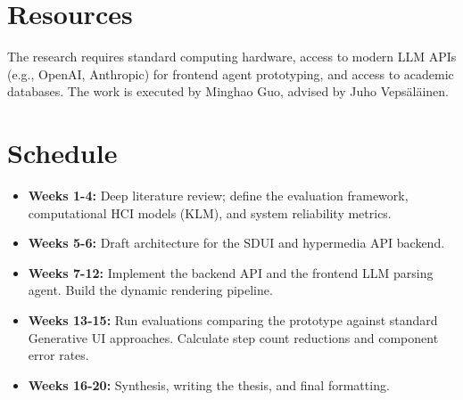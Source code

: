\documentclass[12pt,a4paper,english,oneside]{article}
\begin{document}
\section{Resources}


The research requires standard computing hardware, access to modern LLM APIs (e.g., OpenAI, Anthropic) for frontend agent prototyping, and access to academic databases. The work is executed by Minghao Guo, advised by Juho Vepsäläinen.

\section{Schedule}



\begin{itemize}
    \item \textbf{Weeks 1-4:} Deep literature review; define the evaluation framework, computational HCI models (KLM), and system reliability metrics.
    \item \textbf{Weeks 5-6:} Draft architecture for the SDUI and hypermedia API backend.
    \item \textbf{Weeks 7-12:} Implement the backend API and the frontend LLM parsing agent. Build the dynamic rendering pipeline.
    \item \textbf{Weeks 13-15:} Run evaluations comparing the prototype against standard Generative UI approaches. Calculate step count reductions and component error rates.
    \item \textbf{Weeks 16-20:} Synthesis, writing the thesis, and final formatting.
\end{itemize}
\end{document}

